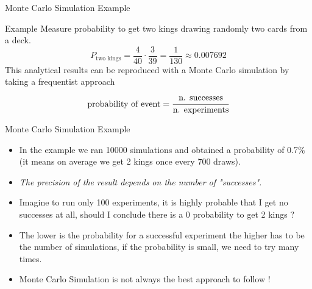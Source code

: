 \documentclass{beamer}
\begin{document}
\begin{frame}{Monte Carlo Simulation Example}
\begin{block}{Example}
Measure probability to get two kings drawing randomly two cards from a deck.
\begin{equation*}
P_{\textrm{two kings}} = \frac{4}{40} \cdot \frac{3}{39} = \frac{1}{130} \approx 0.007692
\end{equation*}
This analytical results can be reproduced with a Monte Carlo simulation by taking a frequentist approach
\begin{equation*}
\textrm{probability of event} = \cfrac{\textrm{n. successes}}{\textrm{n. experiments}}
\end{equation*}
\end{block}

\end{frame}

\begin{frame}{Monte Carlo Simulation Example}
\begin{itemize}
    \item In the example we ran 10000 simulations and obtained a probability of 0.7\% (it means on average we get 2 kings once every 700 draws).
    \item \emph{The precision of the result depends on the number of "successes".}
    \item Imagine to run only 100 experiments, it is highly probable that I get no successes at all, should I conclude there is a 0 probability to get 2 kings ?
    \item The lower is the probability for a successful experiment the higher has to be the number of simulations, if the probability is small, we need to try many times.
    \item Monte Carlo Simulation is not always the best approach to follow !
\end{itemize}
\href{https://colab.research.google.com/drive/1cQbX7jWk4_pfrm72r3ZiZyDEpevP63z2?authuser=1\#scrollTo=b05dd876\&line=1\&uniqifier=1}{}
\end{frame}
\end{document}
